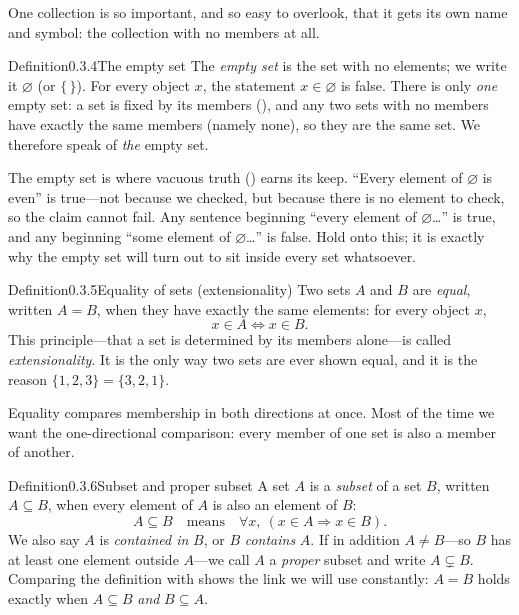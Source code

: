 \documentclass[main.tex]{subfiles}
\begin{document}
\noindent One collection is so important, and so easy to overlook, that it gets its own name and
symbol: the collection with no members at all.

\begin{Obj}{Definition}{0.3.4}{The empty set}
The \emph{empty set} is the set with no elements; we write it $\varnothing$ (or $\{\,\}$). For every
object $x$, the statement $x\in\varnothing$ is false. There is only \emph{one} empty set: a set is
fixed by its members (), and any two sets with no members have exactly the same members
(namely none), so they are the same set. We therefore speak of \emph{the} empty set.
\end{Obj}

\noindent The empty set is where vacuous truth () earns its keep. ``Every element of
$\varnothing$ is even'' is true---not because we checked, but because there is no element to check, so
the claim cannot fail. Any sentence beginning ``every element of $\varnothing$\dots'' is true, and any
beginning ``some element of $\varnothing$\dots'' is false. Hold onto this; it is exactly why the empty
set will turn out to sit inside every set whatsoever.

\begin{Obj}{Definition}{0.3.5}{Equality of sets (extensionality)}
Two sets $A$ and $B$ are \emph{equal}, written $A=B$, when they have exactly the same elements: for
every object $x$,
\[
x\in A \iff x\in B.
\]
This principle---that a set is determined by its members alone---is called
\emph{extensionality}. It is the only way two sets
are ever shown equal, and it is the reason $\{1,2,3\}=\{3,2,1\}$.
\end{Obj}

\noindent Equality compares membership in both directions at once. Most of the time we want the
one-directional comparison: every member of one set is also a member of another.

\begin{Obj}{Definition}{0.3.6}{Subset and proper subset}
A set $A$ is a \emph{subset} of a set $B$, written $A\subseteq B$, when every element of $A$ is also
an element of $B$:
\[
A\subseteq B \quad\text{means}\quad \forall x,\ (x\in A \Rightarrow x\in B).
\]
We also say $A$ is \emph{contained in} $B$, or $B$ \emph{contains} $A$. If in addition $A\neq B$---so
$B$ has at least one element outside $A$---we call $A$ a \emph{proper} subset and write $A\subsetneq
B$. Comparing the definition with  shows the link we will use constantly: $A=B$ holds
exactly when $A\subseteq B$ \emph{and} $B\subseteq A$.
\end{Obj}
\end{document}

